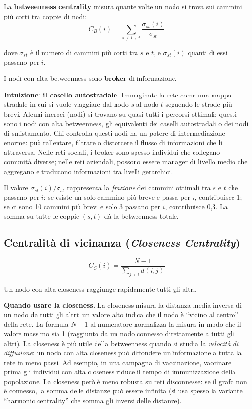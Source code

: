 \documentclass[12pt,a4paper]{article}
\newcommand{\formula}[1]{%
  \begin{equation*}#1\end{equation*}%
}
\begin{document}
La \textbf{betweenness centrality} misura quante volte un nodo si trova sui cammini più corti
tra coppie di nodi:
\formula{C_B(i) = \sum_{s \neq i \neq t} \frac{\sigma_{st}(i)}{\sigma_{st}}}
dove $\sigma_{st}$ è il numero di cammini più corti tra $s$ e $t$, e $\sigma_{st}(i)$
quanti di essi passano per $i$.

I nodi con alta betweenness sono \textbf{broker} di informazione.

\noindent\textbf{Intuizione: il casello autostradale.}
Immaginate la rete come una mappa stradale in cui si vuole viaggiare dal nodo $s$ al nodo
$t$ seguendo le strade più brevi. Alcuni incroci (nodi) si trovano su quasi tutti i percorsi
ottimali: questi sono i nodi con alta betweenness, gli equivalenti dei caselli autostradali
o dei nodi di smistamento. Chi controlla questi nodi ha un potere di intermediazione
enorme: può rallentare, filtrare o distorcere il flusso di informazioni che li attraversa.
Nelle reti sociali, i broker sono spesso individui che collegano comunità diverse; nelle
reti aziendali, possono essere manager di livello medio che aggregano e traducono
informazioni tra livelli gerarchici.

Il valore $\sigma_{st}(i)/\sigma_{st}$ rappresenta la \emph{frazione} dei cammini ottimali
tra $s$ e $t$ che passano per $i$: se esiste un solo cammino più breve e passa per $i$,
contribuisce 1; se ci sono 10 cammini più brevi e solo 3 passano per $i$, contribuisce 0,3.
La somma su tutte le coppie $(s,t)$ dà la betweenness totale.

\subsection{Centralità di vicinanza (\textit{Closeness Centrality})}

\formula{C_C(i) = \frac{N-1}{\sum_{j \neq i} d(i,j)}}

Un nodo con alta closeness raggiunge rapidamente tutti gli altri.

\noindent\textbf{Quando usare la closeness.}
La closeness misura la distanza media inversa di un nodo da tutti gli altri: un valore
alto indica che il nodo è ``vicino al centro'' della rete. La formula $N-1$ al numeratore
normalizza la misura in modo che il valore massimo sia 1 (raggiunto da un nodo connesso
direttamente a tutti gli altri). La closeness è più utile della betweenness quando si
studia la \emph{velocità di diffusione}: un nodo con alta closeness può diffondere
un'informazione a tutta la rete in meno passi. Ad esempio, in una campagna di vaccinazione,
vaccinare prima gli individui con alta closeness riduce il tempo di immunizzazione della
popolazione. La closeness però è meno robusta su reti disconnesse: se il grafo non è
connesso, la somma delle distanze può essere infinita (si usa spesso la variante
``harmonic centrality'' che somma gli inversi delle distanze).
\end{document}
